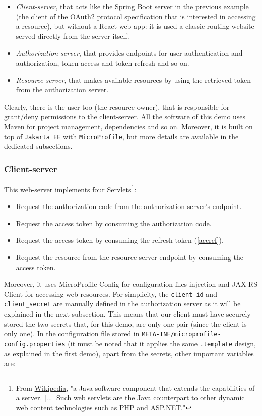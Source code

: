 \begin{itemize}
    \item \textit{Client-server}, that acts like the Spring Boot server in the previous example (the client of the OAuth2 protocol specification that is interested in accessing a resource), but without a React web app: it is used a classic routing website served directly from the server itself.
    \item \textit{Authorization-server}, that provides endpoints for user authentication and authorization, token access and token refresh and so on.
    \item \textit{Resource-server}, that makes available resources by using the retrieved token from the authorization server.
\end{itemize}

Clearly, there is the user too (the resource owner), that is responsible for grant/deny permissions to the client-server. All the software of this demo uses Maven for project management, dependencies and so on. Moreover, it is built on top of \texttt{Jakarta EE} \cite{jaksec} with \texttt{MicroProfile}, but more details are available in the dedicated subsections. 

\subsubsection{Client-server}
This web-server implements four Servlets\footnote{From \href{https://en.wikipedia.org/wiki/Java_servlet}{Wikipedia}, "a Java software component that extends the capabilities of a server. [...] Such web servlets are the Java counterpart to other dynamic web content technologies such as PHP and ASP.NET."}:

\begin{itemize}
    \item Request the authorization code from the authorization server's endpoint.
    \item Request the access token by consuming the authorization code.
    \item Request the access token by consuming the refresh token (\ref{accref}).
    \item Request the resource from the resource server endpoint by consuming the access token.
\end{itemize}

\noindent Moreover, it uses MicroProfile Config for configuration files injection and JAX RS Client for accessing web resources. For simplicity, the \texttt{client\_id} and \texttt{client\_secret} are manually defined in the authorization server as it will be explained in the next subsection. This means that our client must have securely stored the two secrets that, for this demo, are only one pair (since the client is only one). In the configuration file stored in \texttt{META-INF/microprofile-config.properties} (it must be noted that it applies the same \texttt{.template} design, as explained in the first demo), apart from the secrets, other important variables are:

